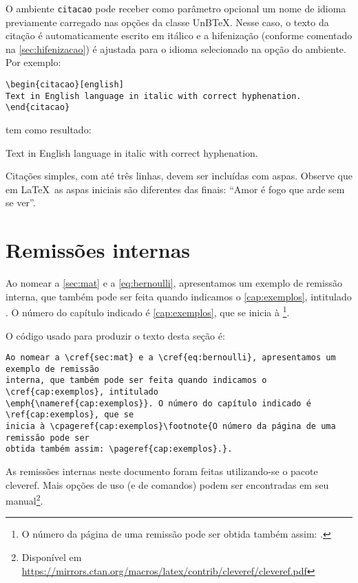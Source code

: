 O ambiente \texttt{citacao} pode receber como parâmetro opcional um nome de idioma previamente carregado nas opções da classe UnB\TeX. Nesse caso, o texto da citação é automaticamente escrito em itálico e a hifenização (conforme comentado na \cref{sec:hifenizacao}) é ajustada para o idioma selecionado na opção do ambiente. Por exemplo:
\begin{verbatim}
\begin{citacao}[english]
Text in English language in italic with correct hyphenation.
\end{citacao}
\end{verbatim}
tem como resultado:
\begin{citacao}[english]
Text in English language in italic with correct hyphenation.
\end{citacao}

Citações simples, com até três linhas, devem ser incluídas com aspas. Observe que em \LaTeX\ as aspas iniciais são diferentes das finais: ``Amor é fogo que arde sem se ver''.

\section{Remissões internas}

Ao nomear a \cref{sec:mat} e a \cref{eq:bernoulli}, apresentamos um exemplo de remissão interna, que também pode ser feita quando indicamos o \cref{cap:exemplos}, intitulado \emph{}. O número do capítulo indicado é \ref{cap:exemplos}, que se inicia à \footnote{O número da página de uma remissão pode ser obtida também assim: \pageref{cap:exemplos}.}.

O código usado para produzir o texto desta seção é:
\begin{verbatim}
Ao nomear a \cref{sec:mat} e a \cref{eq:bernoulli}, apresentamos um exemplo de remissão
interna, que também pode ser feita quando indicamos o \cref{cap:exemplos}, intitulado
\emph{\nameref{cap:exemplos}}. O número do capítulo indicado é \ref{cap:exemplos}, que se
inicia à \cpageref{cap:exemplos}\footnote{O número da página de uma remissão pode ser
obtida também assim: \pageref{cap:exemplos}.}.
\end{verbatim}

As remissões internas neste documento foram feitas utilizando-se o pacote \textsf{cleveref}. Mais opções de uso (e de comandos) podem ser encontradas em seu manual\footnote{Disponível em \url{https://mirrors.ctan.org/macros/latex/contrib/cleveref/cleveref.pdf}}.

